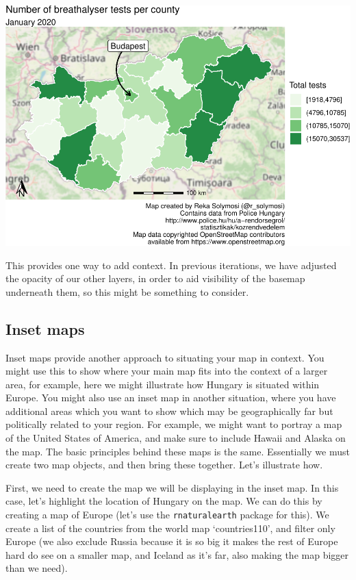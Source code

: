 \documentclass[
]{book}
\begin{document}
\includegraphics{crime_mapping_files/figure-latex/basemap-1.pdf}

This provides one way to add context. In previous iterations, we have adjusted the opacity of our other layers, in order to aid visibility of the basemap underneath them, so this might be something to consider.

\hypertarget{inset-maps}{%
\subsection{Inset maps}\label{inset-maps}}

Inset maps provide another approach to situating your map in context. You might use this to show where your main map fits into the context of a larger area, for example, here we might illustrate how Hungary is situated within Europe. You might also use an inset map in another situation, where you have additional areas which you want to show which may be geographically far but politically related to your region. For example, we might want to portray a map of the United States of America, and make sure to include Hawaii and Alaska on the map. The basic principles behind these maps is the same. Essentially we must create two map objects, and then bring these together. Let's illustrate how.

First, we need to create the map we will be displaying in the inset map. In this case, let's highlight the location of Hungary on the map. We can do this by creating a map of Europe (let's use the \texttt{rnaturalearth} package for this). We create a list of the countries from the world map `countries110', and filter only Europe (we also exclude Russia because it is so big it makes the rest of Europe hard do see on a smaller map, and Iceland as it's far, also making the map bigger than we need).
\end{document}
